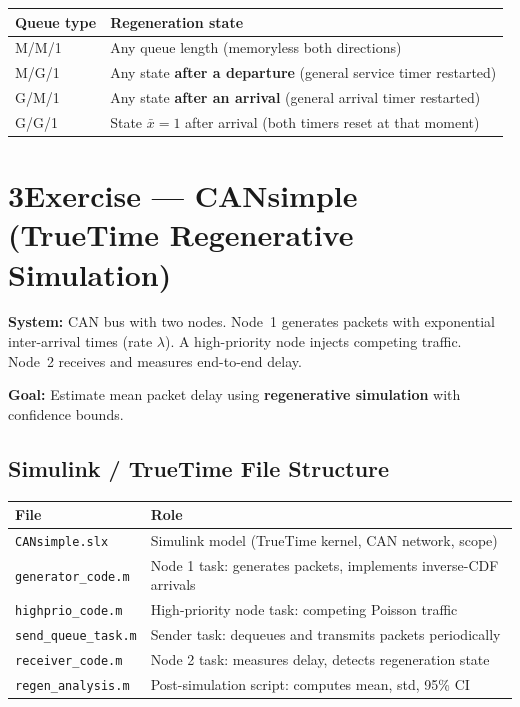 \documentclass[10pt,a4paper]{article}
\begin{document}
\begin{tabular}{@{}l l@{}}
\toprule
Queue type & Regeneration state \\\midrule
M/M/1 & Any queue length (memoryless both directions) \\
M/G/1 & Any state \textbf{after a departure} (general service timer restarted) \\
G/M/1 & Any state \textbf{after an arrival} (general arrival timer restarted) \\
G/G/1 & State $\bar{x}=1$ after arrival (both timers reset at that moment) \\
\bottomrule
\end{tabular}

\section*{3\quad Exercise --- CANsimple (TrueTime Regenerative Simulation)}

\textbf{System:} CAN bus with two nodes. Node~1 generates packets with exponential inter-arrival times (rate $\lambda$). A high-priority node injects competing traffic. Node~2 receives and measures end-to-end delay.

\textbf{Goal:} Estimate mean packet delay using \textbf{regenerative simulation} with confidence bounds.

\subsection*{Simulink / TrueTime File Structure}

\begin{tabular}{@{}l l@{}}
\toprule
File & Role \\\midrule
\texttt{CANsimple.slx} & Simulink model (TrueTime kernel, CAN network, scope) \\
\texttt{generator\_code.m} & Node 1 task: generates packets, implements inverse-CDF arrivals \\
\texttt{highprio\_code.m} & High-priority node task: competing Poisson traffic \\
\texttt{send\_queue\_task.m} & Sender task: dequeues and transmits packets periodically \\
\texttt{receiver\_code.m} & Node 2 task: measures delay, detects regeneration state \\
\texttt{regen\_analysis.m} & Post-simulation script: computes mean, std, 95\% CI \\
\bottomrule
\end{tabular}
\end{document}
